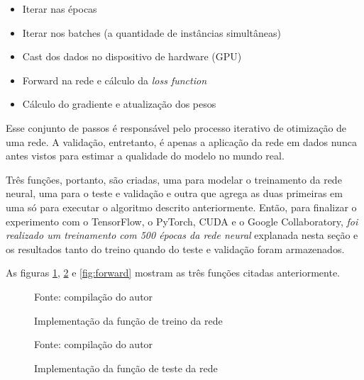 \begin{itemize}
	\item Iterar nas épocas
	\item Iterar nos batches (a quantidade de instâncias simultâneas)
	\item Cast dos dados no dispositivo de hardware (GPU)
	\item Forward na rede e cálculo da \textit{loss function}
	\item Cálculo do gradiente e atualização dos pesos
\end{itemize}

Esse conjunto de passos é responsável pelo processo iterativo de otimização de uma rede. A validação, entretanto, é apenas a aplicação da rede em dados nunca antes vistos para estimar a qualidade do modelo no mundo real.

Três funções, portanto, são criadas, uma para modelar o treinamento da rede neural, uma para o teste e validação e outra que agrega as duas primeiras em uma só para executar o algoritmo descrito anteriormente. Então, para finalizar o experimento com o TensorFlow, o PyTorch, CUDA e o Google Collaboratory, \textit{foi realizado um treinamento com 500 épocas da rede neural} explanada nesta seção e os resultados tanto do treino quando do teste e validação foram armazenados.

As figuras \ref{fig:train}, \ref{fig:test} e \ref{fig:forward} mostram as três funções citadas anteriormente.

\begin{figure}[H]
	\centering
	\caption{Implementação da função de treino da rede}
	
	\label{fig:train}
	{\scriptsize Fonte: compilação do autor}
\end{figure}

\begin{figure}[H]
	\centering
	\caption{Implementação da função de teste da rede}
	
	\label{fig:test}
	{\scriptsize Fonte: compilação do autor}
\end{figure}

